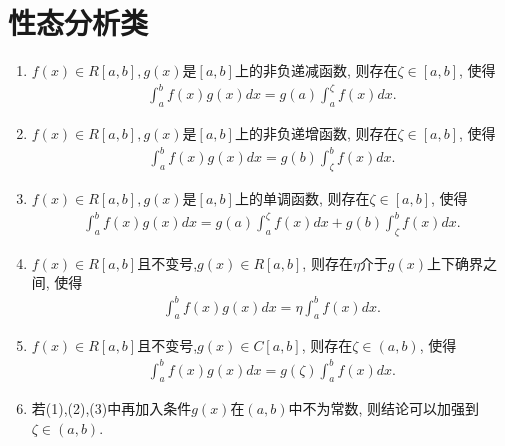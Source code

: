\documentclass[../../main.tex]{subfiles}
\begin{document}
\section{性态分析类}

\begin{theorem}[积分中值定理]\label{theorem:积分中值定理}
\begin{enumerate}[(1)]
\item \label{theorem:积分中值定理(1)}\(f(x)\in R[a,b],g(x)\)是\([a,b]\)上的非负递减函数, 则存在\(\zeta\in[a,b]\), 使得
\begin{align*}
\int_{a}^{b}f(x)g(x)dx = g(a)\int_{a}^{\zeta}f(x)dx.
\end{align*}

\item \label{theorem:积分中值定理(2)} \(f(x)\in R[a,b],g(x)\)是\([a,b]\)上的非负递增函数, 则存在\(\zeta\in[a,b]\), 使得
\begin{align*}
\int_{a}^{b}f(x)g(x)dx = g(b)\int_{\zeta}^{b}f(x)dx.
\end{align*}

\item \label{theorem:积分中值定理(3)}\(f(x)\in R[a,b],g(x)\)是\([a,b]\)上的单调函数, 则存在\(\zeta\in[a,b]\), 使得
\begin{align*}
\int_{a}^{b}f(x)g(x)dx = g(a)\int_{a}^{\zeta}f(x)dx + g(b)\int_{\zeta}^{b}f(x)dx.
\end{align*}

\item \label{theorem:积分中值定理(4)}\(f(x)\in R[a,b]\)且不变号,\(g(x)\in R[a,b]\), 则存在\(\eta\)介于\(g(x)\)上下确界之间, 使得
\begin{align*}
\int_{a}^{b}f(x)g(x)dx = \eta\int_{a}^{b}f(x)dx.
\end{align*}

\item \label{theorem:积分中值定理(5)}\(f(x)\in R[a,b]\)且不变号,\(g(x)\in C[a,b]\), 则存在\(\zeta\in(a,b)\), 使得
\begin{align*}
\int_{a}^{b}f(x)g(x)dx = g(\zeta)\int_{a}^{b}f(x)dx.
\end{align*}

\item 若(1),(2),(3)中再加入条件\(g(x)\)在\((a,b)\)中不为常数, 则结论可以加强到\(\zeta\in(a,b)\).
\end{enumerate}
\end{theorem}
\end{document}
